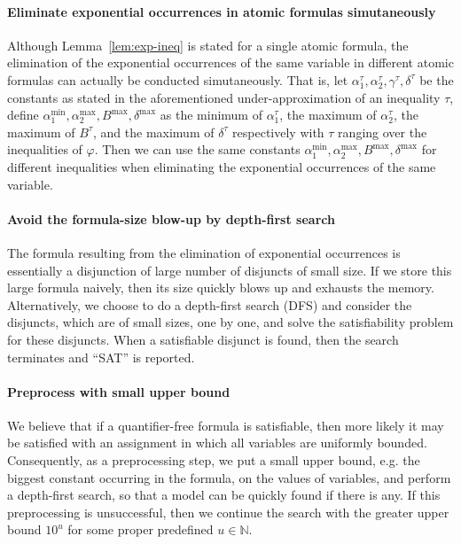 \paragraph{Eliminate exponential occurrences in atomic formulas simutaneously}

Although Lemma~\ref{lem:exp-ineq} is stated for a single atomic formula, the elimination of the exponential occurrences of the same variable in different atomic formulas can actually be conducted simutaneously. That is,  let $\alpha^\tau_{1}, \alpha^\tau_{2}, \gamma^\tau, \delta^\tau$ be the constants as stated in the aforementioned under-approximation of an inequality $\tau$, define $\alpha^{\min}_1, \alpha^{\max}_2, B^{\max}, \delta^{\max}$ as the minimum of $\alpha^\tau_1$, the maximum of $\alpha^\tau_2$, the maximum of $B^\tau$, and the maximum of $\delta^\tau$ respectively with $\tau$ ranging over the inequalities of $\varphi$. Then we can use the same constants $\alpha^{\min}_1, \alpha^{\max}_2, B^{\max}, \delta^{\max}$ for different inequalities when eliminating the exponential occurrences of the same variable. 

\paragraph{Avoid the formula-size blow-up by depth-first search}

The {\pa} formula resulting from the elimination of exponential occurrences is essentially a disjunction of large number of disjuncts of small size. If we store this large formula naively, then its size quickly blows up and exhausts the memory. Alternatively, we choose to do a depth-first search (DFS) and consider the disjuncts, which are of small sizes, one by one, and solve the satisfiability problem for these disjuncts. When a satisfiable disjunct is found, then the search terminates and ``SAT'' is reported.

\paragraph{Preprocess with small upper bound}

We believe that if a quantifier-free {\paexp} formula is satisfiable, then more likely it may be satisfied with an assignment in which all variables are uniformly bounded. Consequently, as a preprocessing step, we put a small upper bound, e.g. the biggest constant occurring in the formula, on the values of variables, and perform a depth-first search, so that a model can be quickly found if there is any. If this preprocessing is unsuccessful, then we continue the search with the greater upper bound $10^u$ for some proper predefined $u \in \mathbb N$.
